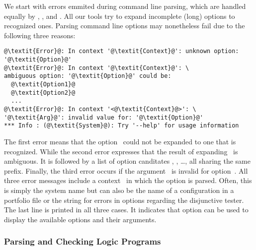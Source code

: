 We start with errors emmited during command line parsing,
which are handled equally by \gringo, \clasp, and \clingo.
All our tools try to expand incomplete (long) options to recognized ones.
Parsing command line options may nonetheless fail due to the following three reasons:
%
\begin{lstlisting}[numbers=none,escapechar=@]
@\textit{Error}@: In context '@\textit{Context}@': unknown option: '@\textit{Option}@'
@\textit{Error}@: In context '@\textit{Context}@': \
ambiguous option: '@\textit{Option}@' could be:
  @\textit{Option1}@
  @\textit{Option2}@
  ...
@\textit{Error}@: In context '<@\textit{Context}@>': \
'@\textit{Arg}@': invalid value for: '@\textit{Option}@'
*** Info : (@\textit{System}@): Try '--help' for usage information
\end{lstlisting}
%
The first error means that the option~
could not be expanded to one that is recognized.
While the second error expresses that the result of expanding~ is ambiguous.
It is followed by a list of option canditates , , \dots, all sharing the same prefix.
Finally, the third error occurs if the argument~\codeit{Arg} is invalid for option~.
All three error messages include a context~\codeit{Context} in which the option is parsed.
Often, this is simply the system name 
but can also be the name of a configuration in a portfolio file
or the string \code{tester} for errors in options regarding the disjunctive tester.
The last line is printed in all three cases.
It indicates that option \code{--help} can be used to display the available options and their arguments.

\subsubsection{Parsing and Checking Logic Programs}\label{subsec:error:parselp}

